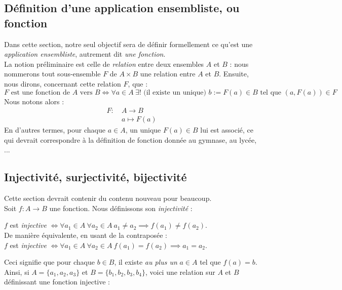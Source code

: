 \documentclass{article}
\begin{document}
\subsection{Définition d'une application ensembliste, ou fonction}
Dans cette section, notre seul objectif sera de définir formellement ce qu'est une \textit{application ensembliste}, autrement dit \textit{une fonction}. \\
La notion préliminaire est celle de \textit{relation} entre deux ensembles $A$ et $B$ : nous nommerons tout sous-ensemble $F$ de $A \times B$ une relation entre $A$ et $B$. Ensuite, nous dirons, concernant cette relation $F$, que :
$$F \text{ est une fonction de }A\text{ vers }B \iff \forall a \in A\ \exists! \text{ (il existe un unique) } b := F(a) \in B \text{ tel que } (a, F(a)) \in F
$$
Nous notons alors :
\begin{align*}
    F: \ &A \to B\\
    &a \mapsto F(a)
\end{align*}
En d'autres termes, pour chaque $a \in A$, un unique $F(a) \in B$ lui est associé, ce qui devrait correspondre à la définition de fonction donnée au gymnase, au lycée, ...

\subsection{Injectivité, surjectivité, bijectivité}
\noindent Cette section devrait contenir du contenu nouveau pour beaucoup.\\

\noindent Soit $f: A \to B$ une fonction. Nous définissons son \textit{injectivité} :
\begin{center}
    $f$ est \textit{injective} $\iff \forall a_1 \in A \ \forall a_2 \in A \ a_1 \neq a_2 \implies f(a_1) \neq f(a_2)$.\\
    
    De manière équivalente, en usant de la contraposée :\\
    
    $f$ est \textit{injective} $\iff \forall a_1 \in A \ \forall a_2 \in A \ f(a_1) = f(a_2) \implies a_1 = a_2$.
\end{center}
Ceci signifie que pour chaque $b \in B$, il existe \textit{au plus un} $a \in A$ tel que $f(a) = b$. Ainsi, si $A = \{a_1, a_2, a_3\}$ et $B = \{b_1, b_2, b_3, b_4\}$, voici une relation sur $A$ et $B$ définissant une fonction injective :

\begin{center}
\end{center}
\end{document}
